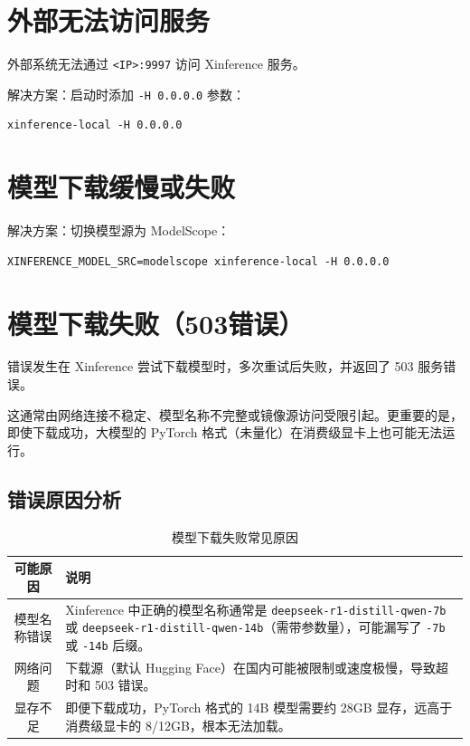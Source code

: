 \documentclass[12pt,UTF8]{ctexbook}
\begin{document}
\section{外部无法访问服务}
\label{sec:access_issue}

外部系统无法通过 \texttt{<IP>:9997} 访问 Xinference 服务。

解决方案：启动时添加 \texttt{-H 0.0.0.0} 参数：

\begin{lstlisting}
xinference-local -H 0.0.0.0
\end{lstlisting}

\section{模型下载缓慢或失败}
\label{sec:model_download}

解决方案：切换模型源为 ModelScope：

\begin{lstlisting}
XINFERENCE_MODEL_SRC=modelscope xinference-local -H 0.0.0.0
\end{lstlisting}

\section{模型下载失败（503错误）}
\label{sec:model_download_503}

错误发生在 Xinference 尝试下载模型时，多次重试后失败，并返回了 503 服务错误。

这通常由网络连接不稳定、模型名称不完整或镜像源访问受限引起。更重要的是，即使下载成功，大模型的 PyTorch 格式（未量化）在消费级显卡上也可能无法运行。

\subsection{错误原因分析}

\begin{table}[htbp]
    \centering
    \caption{模型下载失败常见原因}
    \begin{tabular}{|c|p{8cm}|}
        \hline
        \textbf{可能原因} & \textbf{说明} \\
        \hline
        模型名称错误 & Xinference 中正确的模型名称通常是 \texttt{deepseek-r1-distill-qwen-7b} 或 \texttt{deepseek-r1-distill-qwen-14b}（需带参数量），可能漏写了 \texttt{-7b} 或 \texttt{-14b} 后缀。 \\
        \hline
        网络问题 & 下载源（默认 Hugging Face）在国内可能被限制或速度极慢，导致超时和 503 错误。 \\
        \hline
        显存不足 & 即便下载成功，PyTorch 格式的 14B 模型需要约 28GB 显存，远高于消费级显卡的 8/12GB，根本无法加载。 \\
        \hline
    \end{tabular}
\end{table}
\end{document}

